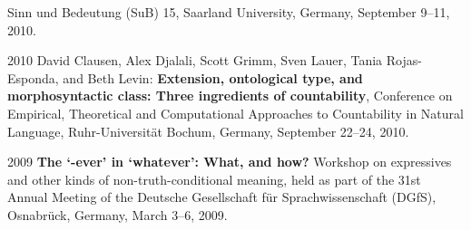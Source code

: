 \begin{dated}
		Sinn und Bedeutung (SuB) 15, 
		Saarland University, Germany, 
		September 9--11, 2010.
	\item[2010]
		David Clausen, Alex Djalali, Scott Grimm, Sven Lauer, Tania Rojas-Esponda, and Beth Levin: 
		\textbf{Extension, ontological type, and morphosyntactic class: Three ingredients of countability}, 
		Conference on Empirical, Theoretical and Computational Approaches to Countability in Natural Language, 
		Ruhr-Universit\"at Bochum, Germany, 
		September 22--24, 2010.
	\item[2009]
		\textbf{The `-ever' in `whatever': What, and how?} 
		Workshop on expressives and other kinds of non-truth-conditional meaning,
		held as part of the 31st Annual Meeting of the {Deutsche Gesellschaft f\"ur Sprachwissenschaft} (DGfS), 
		Osnabr\"uck, Germany, March 3--6, 2009.
\end{dated}
